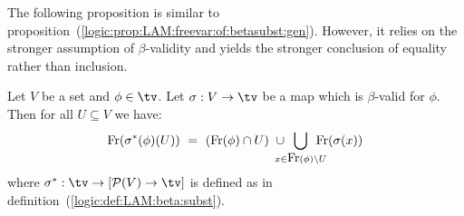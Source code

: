 The following proposition is similar to 
proposition~(\ref{logic:prop:LAM:freevar:of:betasubst:gen}). However,
it relies on the stronger assumption of $\beta$-validity and yields the
stronger conclusion of equality rather than inclusion.

\begin{prop}\label{logic:prop:LAM:freevar:of:betasubst:gen:valid:2}
    Let $V$ be a set and $\phi\in\tv$. Let $\sigma:V\to\tv$ be a map 
    which is $\beta$-valid for $\phi$. Then for all $U\subseteq V$ we have:
    \[
        \free(\sigma^{*}(\phi)(U)) 
            \ =\ 
        (\free(\phi)\cap U)
        \ \cup
        \!\!\!\!\!\!
        \bigcup_{x\in\free(\phi)\setminus U} 
        \!\!\!\!\!\!
        \free(\sigma(x))
    \]
    where $\sigma^{*}:\tv\to[{\cal P}(V)\to\tv]$ is defined as in 
    definition~(\ref{logic:def:LAM:beta:subst}).
\end{prop}
